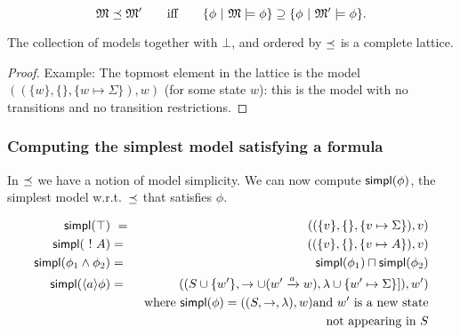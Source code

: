 \begin{theorem}
\[
\frak{M} \preceq \frak{M}'
\qquad\text{iff}\qquad
 \{\phi\ |\ \frak{M} \models \phi \} \supseteq  \{\phi\ |\ \frak{M}' \models \phi \}.
\]
\end{theorem}

\begin{theorem}
The collection of models together with $\bot$, and ordered by $\preceq $
is a complete lattice.  
\end{theorem}
\begin{proof}
  Example: The topmost element in the lattice is
the model $( (\{w\}, \{\}, \{w \mapsto \Sigma\}), w)$ (for some state
$w$): this is the model with no transitions and no transition
restrictions.
\end{proof}

\subsubsection{Computing the simplest model satisfying a formula}

\NI In $\preceq $ we have a notion of model simplicity.  We can now
compute $\mathsf{simpl}(\phi)$, the simplest model w.r.t.~$\preceq $ that
satisfies $\phi$.

\begin{eqnarray*}
  \mathsf{simpl}(\top) &\ = \ & ( (\{v\}, \{\}, \{v \mapsto \Sigma\}), v)  \\
  \mathsf{simpl}(\ ! \  A) & = & ( (\{v\}, \{\}, \{v \mapsto A\}), v)  \\
  \mathsf{simpl}(\phi_1 \land \phi_2) & = & \mathsf{simpl}(\phi_1) \sqcap \mathsf{simpl}(\phi_2)  \\
  \mathsf{simpl}(\langle a \rangle \phi) 
     & = & ( (S \cup \{w'\}, \rightarrow \cup (w' \xrightarrow{a} w), \lambda \cup \{w' \mapsto \Sigma\}]), w')  \\
		& & \mbox{where }\mathsf{simpl}(\phi) = ( (S, \rightarrow, \lambda), w) \mbox{and } w' \mbox{ is a new state} \\
                &&  \mbox{not appearing in }S 
\end{eqnarray*}

